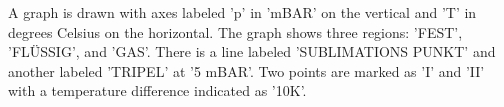 A graph is drawn with axes labeled 'p' in 'mBAR' on the vertical and 'T' in degrees Celsius on the horizontal. The graph shows three regions: 'FEST', 'FLÜSSIG', and 'GAS'. There is a line labeled 'SUBLIMATIONS PUNKT' and another labeled 'TRIPEL' at '5 mBAR'. Two points are marked as 'I' and 'II' with a temperature difference indicated as '10K'.